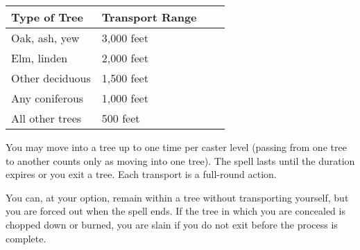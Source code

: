 \begin{longtable}{llll}
\hline
\multicolumn{1}{|p{1.065in}|}{\begin{minipage}[t]{1.065in}\raggedright
\textbf{Type of Tree}\end{minipage}} & \multicolumn{1}{p{1.173in}|}{\begin{minipage}[t]{1.173in}\raggedright
\textbf{Transport Range}\end{minipage}}\\
\hline
\multicolumn{1}{p{0.069in}|}{\begin{minipage}[t]{0.069in}\raggedright
Oak, ash, yew\end{minipage}} & \multicolumn{1}{p{0.069in}|}{\begin{minipage}[t]{0.069in}\raggedright
3,000 feet\end{minipage}}\\
\hline
\multicolumn{1}{|p{1.065in}|}{\begin{minipage}[t]{1.065in}\raggedright
Elm, linden\end{minipage}} & \multicolumn{1}{p{1.173in}|}{\begin{minipage}[t]{1.173in}\raggedright
2,000 feet\end{minipage}}\\
\hline
\multicolumn{1}{p{0.069in}|}{\begin{minipage}[t]{0.069in}\raggedright
Other deciduous\end{minipage}} & \multicolumn{1}{p{0.069in}|}{\begin{minipage}[t]{0.069in}\raggedright
1,500 feet\end{minipage}}\\
\hline
\multicolumn{1}{|p{1.065in}|}{\begin{minipage}[t]{1.065in}\raggedright
Any coniferous\end{minipage}} & \multicolumn{3}{p{1.312in}|}{\begin{minipage}[t]{1.312in}\raggedright
1,000 feet\end{minipage}}\\
\hline
\multicolumn{1}{p{0.069in}|}{\begin{minipage}[t]{0.069in}\raggedright
All other trees\end{minipage}} & \multicolumn{1}{p{0.069in}|}{\begin{minipage}[t]{0.069in}\raggedright
500 feet\end{minipage}}\\
\hline
\end{longtable}

You may move into a tree up to one time per caster level (passing from one tree 
to another counts only as moving into one tree). The spell lasts until the duration 
expires or you exit a tree. Each transport is a full-round action.

You can, at your option, remain within a tree without transporting yourself, but 
you are forced out when the spell ends. If the tree in which you are concealed 
is chopped down or burned, you are slain if you do not exit before the process 
is complete.

